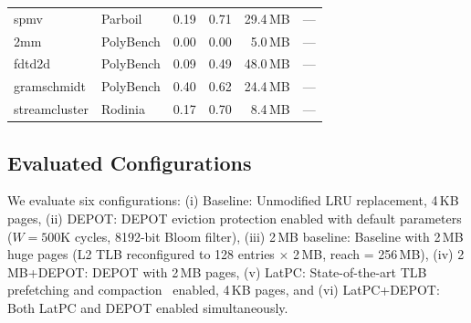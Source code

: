 \begin{table}[t]
\begin{tabular}{@{}llrrrc@{}}
    spmv                      & Parboil   & 0.19   & 0.71   & 29.4\,MB   & --- \\
    2mm            & PolyBench & 0.00   & 0.00   & 5.0\,MB    & --- \\
    fdtd2d          & PolyBench & 0.09   & 0.49   & 48.0\,MB   & --- \\
    gramschmidt               & PolyBench & 0.40   & 0.62   & 24.4\,MB   & --- \\
    streamcluster        & Rodinia   & 0.17   & 0.70   & 8.4\,MB    & --- \\
    \bottomrule
  \end{tabular}
\end{table}


\subsection{Evaluated Configurations}

We evaluate six configurations: (i) Baseline: Unmodified LRU replacement, 4\,KB pages, (ii) DEPOT: DEPOT eviction protection enabled with default parameters ($W = 500\text{K}$ cycles, 8192-bit Bloom filter), (iii) 2\,MB baseline: Baseline with 2\,MB huge pages (L2 TLB reconfigured to 128 entries $\times$ 2\,MB, reach = 256\,MB), (iv) 2\,MB+DEPOT: DEPOT with 2\,MB pages, (v) LatPC: State-of-the-art TLB prefetching and compaction~\cite{latpc} enabled, 4\,KB pages, and (vi) LatPC+DEPOT: Both LatPC and DEPOT enabled simultaneously.

